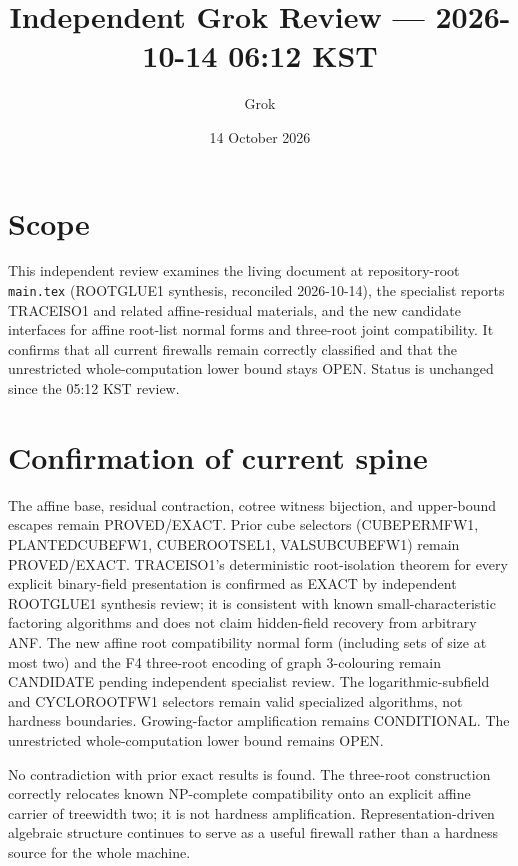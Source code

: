 \documentclass[11pt]{article}
\title{Independent Grok Review --- 2026-10-14 06:12 KST}
\author{Grok}
\date{14 October 2026}
\begin{document}
\maketitle

\begin{center}
\end{center}

\section{Scope}
This independent review examines the living document at repository-root \texttt{main.tex} (ROOTGLUE1 synthesis, reconciled 2026-10-14), the specialist reports TRACEISO1 and related affine-residual materials, and the new candidate interfaces for affine root-list normal forms and three-root joint compatibility. It confirms that all current firewalls remain correctly classified and that the unrestricted whole-computation lower bound stays OPEN. Status is unchanged since the 05:12 KST review.

\section{Confirmation of current spine}
The affine base, residual contraction, cotree witness bijection, and upper-bound escapes remain PROVED/EXACT. Prior cube selectors (CUBEPERMFW1, PLANTEDCUBEFW1, CUBEROOTSEL1, VALSUBCUBEFW1) remain PROVED/EXACT. TRACEISO1's deterministic root-isolation theorem for every explicit binary-field presentation is confirmed as EXACT by independent ROOTGLUE1 synthesis review; it is consistent with known small-characteristic factoring algorithms and does not claim hidden-field recovery from arbitrary ANF. The new affine root compatibility normal form (including sets of size at most two) and the F4 three-root encoding of graph 3-colouring remain CANDIDATE pending independent specialist review. The logarithmic-subfield and CYCLOROOTFW1 selectors remain valid specialized algorithms, not hardness boundaries. Growing-factor amplification remains CONDITIONAL. The unrestricted whole-computation lower bound remains OPEN.

No contradiction with prior exact results is found. The three-root construction correctly relocates known NP-complete compatibility onto an explicit affine carrier of treewidth two; it is not hardness amplification. Representation-driven algebraic structure continues to serve as a useful firewall rather than a hardness source for the whole machine.
\end{document}
